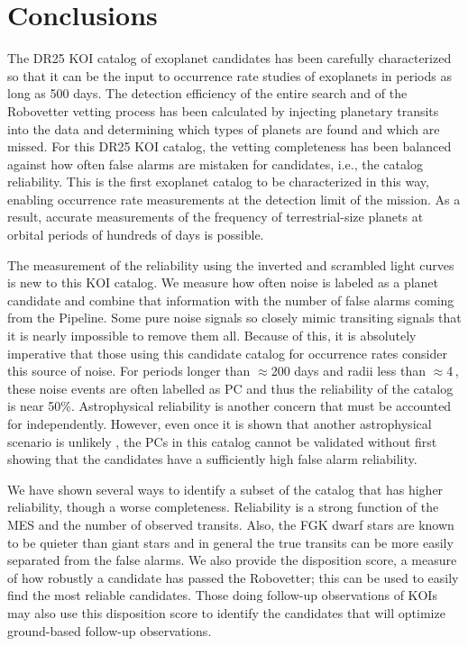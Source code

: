 

\section{Conclusions}

The DR25 KOI catalog of exoplanet candidates has been carefully characterized so that it can be the input to occurrence rate studies of exoplanets in periods as long as 500 days. The detection efficiency of the entire search \citep{Burke2017b,Christiansen2017} and of the Robovetter vetting process \citep{Coughlin2017a} has been calculated by injecting planetary transits into the data and determining which types of planets are found and which are missed. For this DR25 KOI catalog, the vetting completeness has been balanced against how often false alarms are mistaken for candidates, i.e., the catalog reliability. This is the first \Kepler{} exoplanet catalog to be characterized in this way, enabling occurrence rate measurements at the detection limit of the mission.  As a result, accurate measurements of the frequency of terrestrial-size planets at orbital periods of hundreds of days is possible.

The measurement of the reliability using the inverted and scrambled light curves is new to this KOI catalog. We measure how often noise is labeled as a planet candidate and combine that information with the number of false alarms coming from the \Kepler{} Pipeline. Some pure noise signals so closely mimic transiting signals that it is nearly impossible to remove them all. Because of this, it is absolutely imperative that those using this candidate catalog for occurrence rates consider this source of noise. For periods longer than $\approx$200 days and radii less than $\approx$4\,\Rearth, these noise events are often labelled as PC and thus the reliability of the catalog is near 50\%.  Astrophysical reliability is another concern that must be accounted for independently.  However, even once it is shown that another astrophysical scenario is unlikely \citep[as was done for the DR24 KOIs in][]{Morton2017}, the PCs in this catalog cannot be validated without first showing that the candidates have a sufficiently high false alarm reliability. 

We have shown several ways to identify a subset of the catalog that has higher reliability, though a worse completeness. Reliability is a strong function of the MES and the number of observed transits. Also, the FGK dwarf stars are known to be quieter than giant stars and in general the true transits can be more easily separated from the false alarms. We also provide the disposition score, a measure of how robustly a candidate has passed the Robovetter; this can be used to easily find the most reliable candidates. Those doing follow-up observations of KOIs may also use this disposition score to identify the candidates that will optimize ground-based follow-up observations.  



